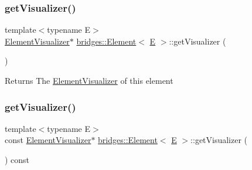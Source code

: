 \mbox{\label{classbridges_1_1_element_a358f350ae6e33d55c4ac9f9213d0c5bc}} 
\subsubsection{\texorpdfstring{getVisualizer()}{getVisualizer()}\hspace{0.1cm}{\footnotesize\ttfamily [1/2]}}
{\footnotesize\ttfamily template$<$typename E$>$ \\
\mbox{\hyperlink{classbridges_1_1_element_visualizer}{Element\+Visualizer}}$\ast$ \mbox{\hyperlink{classbridges_1_1_element}{bridges\+::\+Element}}$<$ \mbox{\hyperlink{namespacebridges_acfb0a4f7877d8f63de3e6862004c50eda3a3ea00cfc35332cedf6e5e9a32e94da}{E}} $>$\+::get\+Visualizer (\begin{DoxyParamCaption}{ }\end{DoxyParamCaption})\hspace{0.3cm}{\ttfamily [inline]}}

\begin{DoxyReturn}{Returns}
The \mbox{\hyperlink{classbridges_1_1_element_visualizer}{Element\+Visualizer}} of this element 
\end{DoxyReturn}
\mbox{\label{classbridges_1_1_element_a27d023054130e17234ace34ba35e766e}} 
\subsubsection{\texorpdfstring{getVisualizer()}{getVisualizer()}\hspace{0.1cm}{\footnotesize\ttfamily [2/2]}}
{\footnotesize\ttfamily template$<$typename E$>$ \\
const \mbox{\hyperlink{classbridges_1_1_element_visualizer}{Element\+Visualizer}}$\ast$ \mbox{\hyperlink{classbridges_1_1_element}{bridges\+::\+Element}}$<$ \mbox{\hyperlink{namespacebridges_acfb0a4f7877d8f63de3e6862004c50eda3a3ea00cfc35332cedf6e5e9a32e94da}{E}} $>$\+::get\+Visualizer (\begin{DoxyParamCaption}{ }\end{DoxyParamCaption}) const\hspace{0.3cm}{\ttfamily [inline]}}

